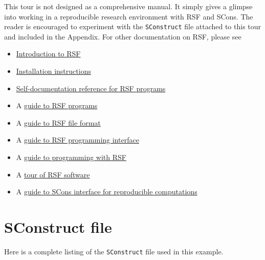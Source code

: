 This tour is not designed as a comprehensive manual. It simply gives a
glimpse into working in a reproducible research environment with RSF
and SCons. The reader is encouraged to experiment with the
\texttt{SConstruct} file attached to this tour and included in the
Appendix. For other documentation on RSF, please see
\begin{itemize}
\item \href{http://egl.beg.utexas.edu/RSF/book/rsf/rsf/tour_html/}{Introduction to RSF}  
\item  \href{http://egl.beg.utexas.edu/RSF/book/rsf/rsf/install_html/}{Installation instructions}
\item \href{http://egl.beg.utexas.edu/RSF/}{Self-documentation reference for RSF programs}
\item A \href{http://egl.beg.utexas.edu/RSF/book/rsf/rsf/prog_html/}{guide to RSF programs}
\item A \href{http://egl.beg.utexas.edu/RSF/book/rsf/rsf/format_html/}
  {guide to RSF file format}
\item A \href{http://egl.beg.utexas.edu/RSF/book/rsf/rsf/api_html/}{guide to
    RSF programming interface}
\item A \href{http://egl.beg.utexas.edu/RSF/book/rsf/rsf/demo_html/}{guide to programming with RSF}
\item A \href{http://egl.beg.utexas.edu/RSF/book/rsf/rsf/tour_html/}{tour of RSF software}
\item A
  \href{http://egl.beg.utexas.edu/RSF/book/rsf/scons/paper_html/}{guide
    to SCons interface for reproducible computations}
\end{itemize}




\appendix
\section{SConstruct file}

Here is a complete listing of the \texttt{SConstruct} file used in this
example.


